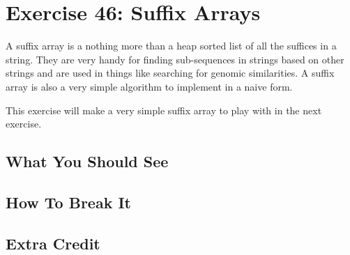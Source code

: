 \chapter{Exercise 46: Suffix Arrays}

A suffix array is a nothing more than a heap sorted list of all the suffices in a string.  They are
very handy for finding sub-sequences in strings based on other strings and are used in things like
searching for genomic similarities.  A suffix array is also a very simple algorithm to implement
in a naive form.

This exercise will make a very simple suffix array to play with in the next exercise.


\section{What You Should See}


\section{How To Break It}


\section{Extra Credit}



